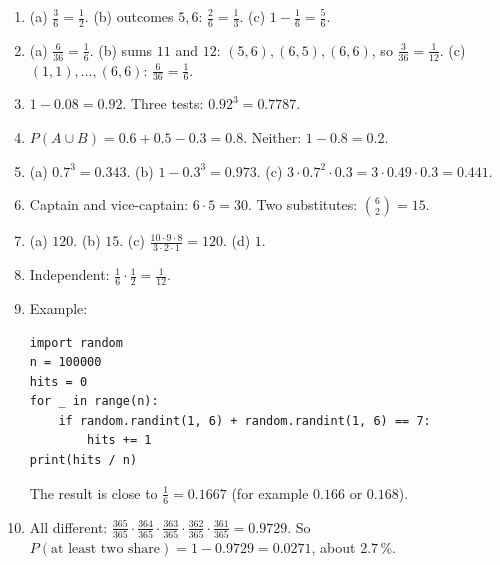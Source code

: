 \begin{enumerate}[label=\textbf{\ansnum.\arabic*}]
  \item (a) $\frac36=\frac12$. (b) outcomes $5,6$: $\frac26=\frac13$. (c) $1-\frac16=\frac56$.
  \item (a) $\frac6{36}=\frac16$. (b) sums $11$ and $12$: $(5,6),(6,5),(6,6)$, so $\frac3{36}=\frac1{12}$. (c) $(1,1),\dots,(6,6)$: $\frac6{36}=\frac16$.
  \item $1-0.08=0.92$. Three tests: $0.92^3=0.7787$.
  \item $P(A\cup B)=0.6+0.5-0.3=0.8$. Neither: $1-0.8=0.2$.
  \item (a) $0.7^3=0.343$. (b) $1-0.3^3=0.973$. (c) $3\cdot0.7^2\cdot0.3=3\cdot0.49\cdot0.3=0.441$.
  \item Captain and vice-captain: $6\cdot5=30$. Two substitutes: $\binom62=15$.
  \item (a) $120$. (b) $15$. (c) $\frac{10\cdot9\cdot8}{3\cdot2\cdot1}=120$. (d) $1$.
  \item Independent: $\frac16\cdot\frac12=\frac1{12}$.
  \item Example:
\begin{verbatim}
import random
n = 100000
hits = 0
for _ in range(n):
    if random.randint(1, 6) + random.randint(1, 6) == 7:
        hits += 1
print(hits / n)
\end{verbatim}
  The result is close to $\frac16=0.1667$ (for example $0.166$ or $0.168$).
  \item[\textbf{\ansnum.10}] All different: $\frac{365}{365}\cdot\frac{364}{365}\cdot\frac{363}{365}\cdot\frac{362}{365}\cdot\frac{361}{365}=0.9729$. So $P(\text{at least two share})=1-0.9729=0.0271$, about $2.7\,\%$.
\end{enumerate}

